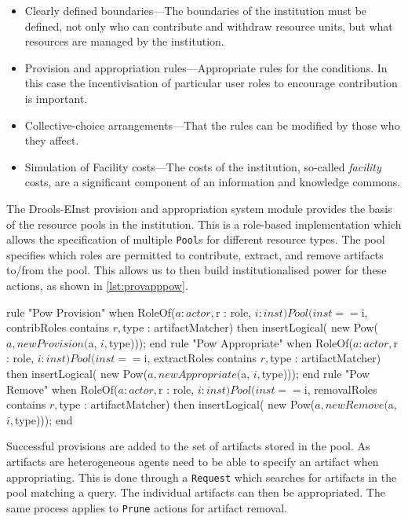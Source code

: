 \begin{itemize}
\item Clearly defined boundaries---The boundaries of the institution must be defined, not only who can contribute and withdraw resource units, but what resources are managed by the institution.
\item Provision and appropriation rules---Appropriate rules for the conditions. In this case the incentivisation of particular user roles to encourage contribution is important.
\item Collective-choice arrangements---That the rules can be modified by those who they affect.
\item Simulation of Facility costs---The costs of the institution, so-called \emph{facility} costs, are a significant component of an information and knowledge commons.
\end{itemize}

The Drools-EInst provision and appropriation system module provides the basis
of the resource pools in the institution. This is a role-based implementation
which allows the specification of multiple \texttt{Pool}s for different
resource types. The pool specifies which roles are permitted to contribute,
extract, and remove artifacts to/from the pool. This allows us to then build
institutionalised power for these actions, as shown in \autoref{lst:provapppow}.

\begin{drools}[label=lst:provapppow,caption={Institutionalised power for provision, appropration and removal from a pool of artifacts.}]
rule "Pow Provision"
	when
		RoleOf($a : actor, $r : role, $i : inst)
		Pool(inst == $i, contribRoles contains $r, $type : artifactMatcher)
	then
		insertLogical( new Pow($a, new Provision($a, $i, $type)));
end
rule "Pow Appropriate"
	when
		RoleOf($a : actor, $r : role, $i : inst)
		Pool(inst == $i, extractRoles contains $r, $type : artifactMatcher)
	then
		insertLogical( new Pow($a, new Appropriate($a, $i, $type)));
end
rule "Pow Remove"
	when
		RoleOf($a : actor, $r : role, $i : inst)
		Pool(inst == $i, removalRoles contains $r, $type : artifactMatcher)
	then
		insertLogical( new Pow($a, new Remove($a, $i, $type)));
end
\end{drools}

Successful provisions are added to the set of artifacts stored in the pool. As
artifacts are heterogeneous agents need to be able to specify an artifact when
appropriating. This is done through a \texttt{Request} which searches for
artifacts in the pool matching a query. The individual artifacts can then be
appropriated. The same process applies to \texttt{Prune} actions for artifact
removal.

